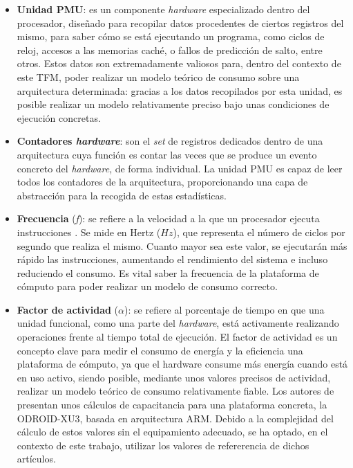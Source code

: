 \begin{itemize}
    \item \textbf{Unidad \ac{PMU}}: es un componente \textit{hardware} especializado dentro del procesador, diseñado para recopilar datos procedentes de ciertos registros del mismo, para saber cómo se está ejecutando un programa, como ciclos de reloj, accesos a las memorias caché, o fallos de predicción de salto, entre otros. Estos datos son extremadamente valiosos para, dentro del contexto de este \ac{TFM}, poder realizar un modelo teórico de consumo sobre una arquitectura determinada: gracias a los datos recopilados por esta unidad, es posible realizar un modelo relativamente preciso bajo unas condiciones de ejecución concretas.

    \item \textbf{Contadores \textit{hardware}}: son el \textit{set} de registros dedicados dentro de una arquitectura cuya función es contar las veces que se produce un evento concreto del \textit{hardware}, de forma individual. La unidad \ac{PMU} es capaz de leer todos los contadores de la arquitectura, proporcionando una capa de abstracción para la recogida de estas estadísticas.

    \item \textbf{Frecuencia} (\emph{f}): se refiere a la velocidad a la que un procesador ejecuta instrucciones \cite{frecuencia}. Se mide en Hertz ($Hz$), que representa el número de ciclos por segundo que realiza el mismo. Cuanto mayor sea este valor, se ejecutarán más rápido las instrucciones, aumentando el rendimiento del sistema e incluso reduciendo el consumo. Es vital saber la frecuencia de la plataforma de cómputo para poder realizar un modelo de consumo correcto.  

    \item \textbf{Factor de actividad} ($\alpha$): se refiere al porcentaje de tiempo en que una unidad funcional, como una parte del \textit{hardware}, está activamente realizando operaciones frente al tiempo total de ejecución. El factor de actividad es un concepto clave para medir el consumo de energía y la eficiencia una plataforma de cómputo, ya que el hardware consume más energía cuando está en uso activo, siendo posible, mediante unos valores precisos de actividad, realizar un modelo teórico de consumo relativamente fiable. Los autores de \cite{soton393728} \cite{soton418538} presentan unos cálculos de capacitancia para una plataforma concreta, la ODROID-XU3, basada en arquitectura \ac{ARM}. Debido a la complejidad del cálculo de estos valores sin el equipamiento adecuado, se ha optado, en el contexto de este trabajo, utilizar los valores de refererencia de dichos artículos.
\end{itemize}

